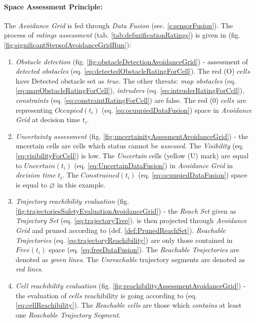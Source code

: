 \paragraph{Space Assessment Principle:} The \emph{Avoidance Grid} is fed through \emph{Data Fusion} (sec. \ref{s:sensorFusion}). The process of \emph{ratings assessment} (tab. \ref{tab:defuzificationRatings}) is given in (fig. \ref{fig:significantStepsofAvoidanceGridRun}):
\begin{enumerate}
    \item \emph{Obstacle detection} (fig. \ref{fig:obstacleDetectionAvoidanceGrid}) - assessment of \emph{detected obstacles} (eq. \ref{eq:detectedObstacleRatingForCell}). The red (O) $cells$ have Detected obstacle set as \emph{true}. The other threats: \emph{map obstacles} (eq. \ref{eq:mapObstacleRatingForCell}), \emph{intruders} (eq. \ref{eq:intruderRatingForCell}), \emph{constraints} (eq. \ref{eq:constraintRatingForCell}) are false. The red (0) $cells$ are representing $Occupied(t_i)$ (eq. \ref{eq:ocuupiedDataFusion}) space in \emph{Avoidance Grid} at decision time $t_i$.
    
    \item \emph{Uncertainty assessment} (fig. \ref{fig:uncertainityAssesmentAvoidanceGrid}) - the uncertain cells are cells which status cannot be \emph{assessed}. The \emph{Visibility} (eq. \ref{eq:visibilityForCell}) is low. The \emph{Uncertain} cells (yellow (U) mark) are equal to $Uncertain(t_i)$ (eq. \ref{eq:UncertainDataFusion}) in \emph{Avoidance Grid} in \emph{decision time} $t_i$. The $Constrained(t_i)$ (eq. \ref{eq:ocuupiedDataFusion}) space is equal to $\varnothing$ in this example.
    
    \item \emph{Trajectory reachibility evaluation} (fig. \ref{fig:trajectoriesSafetyEvaluationAvoidanceGrid}) - the \emph{Reach Set} given as \emph{Trajectory Set} (eq. \ref{eq:trajectoryTree}). is then projected through \emph{Avoidance Grid} and pruned according to (def. \ref{def:PrunedReachSet}). \emph{Reachable Trajectories} (eq. \ref{eq:trajectoryReachibility}) are only those contained in $Free(t_i)$ space (eq. \ref{eq:freeDataFusion}). The \emph{Reachable Trajectories} are denoted as \emph{green lines}. The \emph{Unreachable} trajectory segments are denoted as \emph{red lines}. 
    
    \item \emph{Cell reachibility evaluation} (fig. \ref{fig:reachibilityAssessmentAvoidanceGrid}) - the evaluation of $cells$ reachibility is going according to (eq. \ref{eq:cellReachibility}). The \emph{Reachable cells} are those which \emph{contains} at least one \emph{Reachable Trajectory Segment}.
\end{enumerate}



